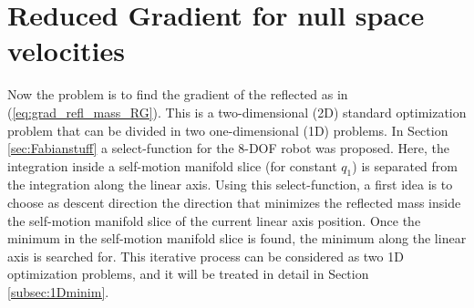 











 





	
	






 



\section{Reduced Gradient for null space velocities}
\label{sec:1D2D}

Now the problem is to find the gradient of the reflected as in (\ref{eq:grad_refl_mass_RG}). This is a two-dimensional (2D) standard optimization problem that can be divided in two one-dimensional (1D) problems. In Section \ref{sec:Fabianstuff} a select-function for the 8-DOF robot was proposed. Here, the integration inside a self-motion manifold slice (for constant $q_1$) is separated from the integration along the linear axis. Using this select-function, a first idea is to choose as descent direction the direction that minimizes the reflected mass inside the self-motion manifold slice of the current linear axis position. Once the minimum in the self-motion manifold slice is found, the minimum along the linear axis is searched for. This iterative process can be considered as two 1D optimization problems, and it will be treated in detail in Section \ref{subsec:1Dminim}.

